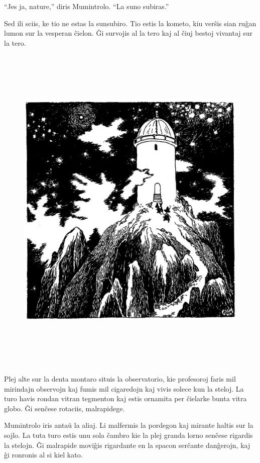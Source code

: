 ``Jes ja, nature,'' diris Mumintrolo. ``La suno subiras.''

Sed ili sciis, ke tio ne estas la sunsubiro. Tio estis la kometo, kiu verŝis sian ruĝan lumon sur la vesperan ĉielon. Ĝi survojis al la tero kaj al ĉiuj bestoj vivantaj sur la tero.

\sectionbreak


\begin{figure}[htbp]
\centering
\includegraphics[width=443pt,height=462pt]{4-5.png}
\caption{}
\label{4-5}
\end{figure}

Plej alte sur la denta montaro situis la observatorio, kie profesoroj faris mil mirindajn observojn kaj fumis mil cigaredojn kaj vivis solece kun la steloj. La turo havis rondan vitran tegmenton kaj estis ornamita per ĉielarke bunta vitra globo. Ĝi senĉese rotaciis, malrapidege.

Mumintrolo iris antaŭ la aliaj. Li malfermis la pordegon kaj mirante haltis sur la sojlo. La tuta turo estis unu sola ĉambro kie la plej granda lorno senĉese rigardis la stelojn. Ĝi malrapide moviĝis rigardante en la spacon serĉante danĝerojn, kaj ĝi ronronis al si kiel kato.

